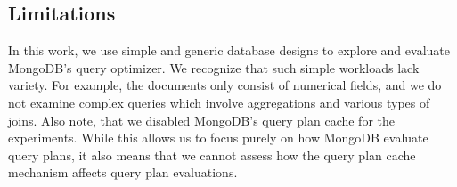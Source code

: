 



\subsection{Limitations}
In this work, we use simple and generic database designs to explore and evaluate MongoDB's \approachName query optimizer. We recognize that such simple workloads lack variety. For example, the documents only consist of numerical fields, and we do not examine complex queries which involve aggregations and various types of joins.
Also note, that we disabled MongoDB's query plan cache for the experiments. While this allows us to focus purely on how MongoDB evaluate query plans, it also means that we cannot assess how the query plan cache mechanism affects query plan evaluations. 

